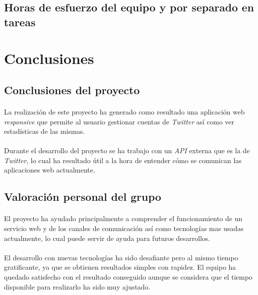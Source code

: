 \documentclass[a4paper]{article}
\begin{document}
	\subsection{Horas de esfuerzo del equipo y por separado en tareas}

\section{Conclusiones}
	\subsection{Conclusiones del proyecto}
	
		\paragraph{} La realización de este proyecto ha generado como resultado una aplicación web \textit{responsive} que permite al usuario gestionar cuentas de \textit{Twitter} así como ver estadísticas de las mismas.
		
		\paragraph{} Durante el desarrollo del proyecto se ha trabajo con un \textit{API} externa que es la de \textit{Twitter}, lo cual ha resultado útil a la hora de entender cómo se comunican las aplicaciones web actualmente. 
	
	\subsection{Valoración personal del grupo}
	
		\paragraph{} El proyecto ha ayudado principalmente a comprender el funcionamiento de un servicio web y de los canales de comunicación así como tecnologías mas usadas actualmente, lo cual puede servir de ayuda para futuros desarrollos.
	
		\paragraph{} El desarrollo con nuevas tecnologías ha sido desafiante pero al mismo tiempo gratificante, ya que se obtienen resultados simples con rapidez. El equipo ha quedado satisfecho con el resultado conseguido aunque se considera que el tiempo disponible para realizarlo ha sido muy ajustado.
		
\end{document}
